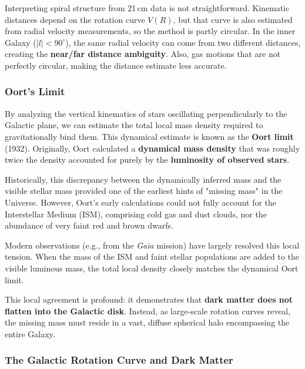 \begin{observationblock}
    Interpreting spiral structure from 21\,cm data is not straightforward. Kinematic distances depend on the rotation curve $V(R)$, but that curve is also estimated from radial velocity measurements, so the method is partly circular. In the inner Galaxy ($|l| < 90^\circ$), the same radial velocity can come from two different distances, creating the \textbf{near/far distance ambiguity}. Also, gas motions that are not perfectly circular, making the distance estimate less accurate.
\end{observationblock}

\subsubsection{Oort's Limit}

By analyzing the vertical kinematics of stars oscillating perpendicularly to the Galactic plane, we can estimate the total local mass density required to gravitationally bind them. This dynamical estimate is known as the \textbf{Oort limit} (1932). Originally, Oort calculated a \textbf{dynamical mass density} that was roughly twice the density accounted for purely by the \textbf{luminosity of observed stars}.

Historically, this discrepancy between the dynamically inferred mass and the visible stellar mass provided one of the earliest hints of "missing mass" in the Universe. However, Oort's early calculations could not fully account for the Interstellar Medium (ISM), comprising cold gas and dust clouds, nor the abundance of very faint red and brown dwarfs.

Modern observations (e.g., from the \textit{Gaia} mission) have largely resolved this local tension. When the mass of the ISM and faint stellar populations are added to the visible luminous mass, the total local density closely matches the dynamical Oort limit. 

This local agreement is profound: it demonstrates that \textbf{dark matter does not flatten into the Galactic disk}. Instead, as large-scale rotation curves reveal, the missing mass must reside in a vast, diffuse spherical halo encompassing the entire Galaxy.

\subsubsection{The Galactic Rotation Curve and Dark Matter}


